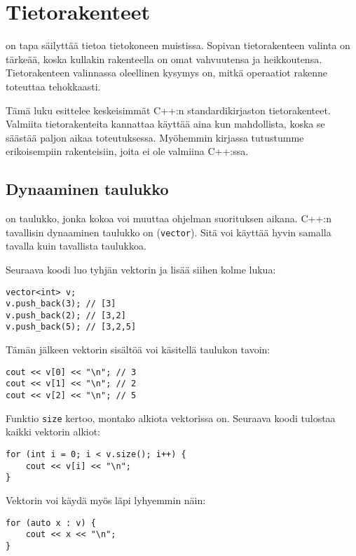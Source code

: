 \chapter{Tietorakenteet}


on tapa säilyttää tietoa tietokoneen muistissa.
Sopivan tietorakenteen valinta on tärkeää,
koska kullakin rakenteella on omat
vahvuutensa ja heikkoutensa.
Tietorakenteen valinnassa oleellinen kysymys on,
mitkä operaatiot rakenne toteuttaa tehokkaasti.

Tämä luku esittelee keskeisimmät
C++:n standardikirjaston tietorakenteet.
Valmiita tietorakenteita kannattaa käyttää
aina kun mahdollista, 
koska se säästää paljon aikaa toteutuksessa.
Myöhemmin kirjassa tutustumme erikoisempiin
rakenteisiin, joita ei ole valmiina C++:ssa.

\section{Dynaaminen taulukko}


 on taulukko,
jonka kokoa voi muuttaa
ohjelman suorituksen aikana.
C++:n tavallisin dynaaminen taulukko
on  (\texttt{vector}).
Sitä voi käyttää hyvin samalla tavalla
kuin tavallista taulukkoa.

Seuraava koodi luo tyhjän vektorin
ja lisää siihen kolme lukua:

\begin{lstlisting}
vector<int> v;
v.push_back(3); // [3]
v.push_back(2); // [3,2]
v.push_back(5); // [3,2,5]
\end{lstlisting}

Tämän jälkeen vektorin sisältöä voi käsitellä taulukon tavoin:

\begin{lstlisting}
cout << v[0] << "\n"; // 3
cout << v[1] << "\n"; // 2
cout << v[2] << "\n"; // 5
\end{lstlisting}

Funktio \texttt{size} kertoo, montako alkiota vektorissa on.
Seuraava koodi tulostaa kaikki vektorin alkiot:

\begin{lstlisting}
for (int i = 0; i < v.size(); i++) {
    cout << v[i] << "\n";
}
\end{lstlisting}

\begin{samepage}
Vektorin voi käydä myös läpi lyhyemmin näin:

\begin{lstlisting}
for (auto x : v) {
    cout << x << "\n";
}
\end{lstlisting}
\end{samepage}

